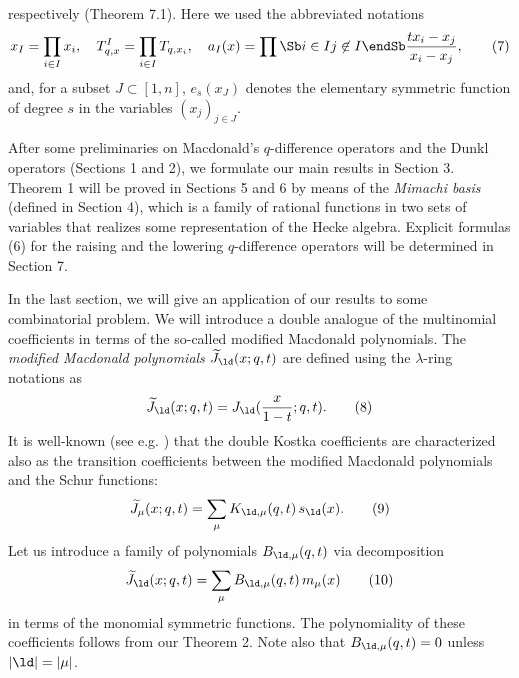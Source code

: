 respectively (Theorem 7.1).  Here we used the abbreviated notations 
$$
x_I=\prod_{i\in I}x_i, \quad T_{q,x}^I=\prod_{i\in I}T_{q,x_i}, \quad
a_I(x)=\prod\Sb i\in I\\ j\not\in I\endSb \frac{tx_i-x_j}{x_i-x_j}, 
\tag{7}
$$ 
and, for a subset $J\subset[1,n]$, 
$e_{s}(x_J)$ denotes the elementary 
symmetric function of degree $s$ in the variables 
$(x_j)_{j\in J}$.
\par
After some preliminaries on Macdonald's $q$-difference operators and
the Dunkl operators (Sections 1 and 2), we formulate our main results in 
Section 3.  
Theorem 1 will be proved in Sections 5 and 6 by means of the 
{\it Mimachi basis} (defined in Section 4), 
which is a family of rational functions in two sets of variables that 
realizes some representation of the Hecke algebra.  
Explicit formulas (6) for the raising and the lowering 
$q$-difference operators will be determined in 
Section 7.  
\par
In the last section, we will give an application of our results to 
some combinatorial problem. 
We will introduce a double analogue of the multinomial coefficients 
in terms of the so-called modified Macdonald polynomials. 
The {\it modified Macdonald polynomials} $\widetilde{J}_\ld(x;q,t)$ 
are defined using the $\lambda$-ring notations 
as 
$$
\widetilde{J}_{\ld}(x;q,t) = J_\ld(\frac{x}{1-t};q,t). 
\tag{8}
$$
It is well-known (see e.g. \cite{GH}) that the double Kostka coefficients 
are characterized also as the transition coefficients between the modified 
Macdonald polynomials and the Schur functions: 
$$
\widetilde{J}_{\mu}(x;q,t)=\sum_{\mu} K_{\ld,\mu}(q,t) \, s_{\ld}(x). 
\tag{9}
$$
Let us introduce a family of polynomials $B_{\ld,\mu}(q,t)$ via decomposition
$$
\widetilde{J}_{\ld}(x;q,t)=\sum_{\mu} B_{\ld,\mu}(q,t) \, m_{\mu}(x)
\tag{10}
$$
in terms of the monomial symmetric functions.
The polynomiality of these coefficients follows from our Theorem 2. 
Note also that $B_{\ld,\mu}(q,t)=0$ unless $|\ld|=|\mu|$.
% 
